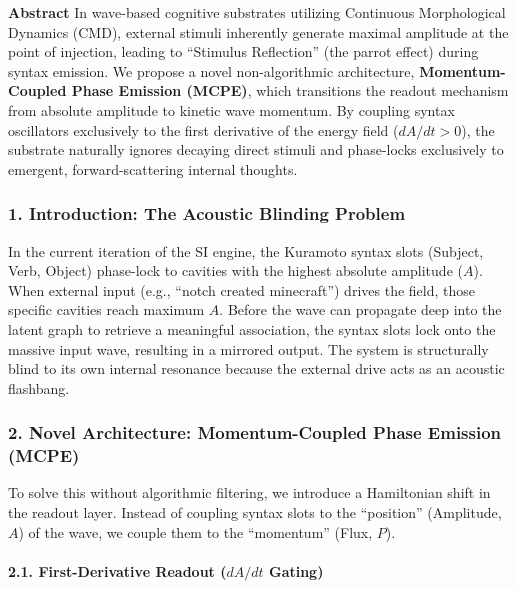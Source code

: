 \documentclass[
  11pt,
  a4paper,
]{article}
\begin{document}
\textbf{Abstract} In wave-based cognitive substrates utilizing
Continuous Morphological Dynamics (CMD), external stimuli inherently
generate maximal amplitude at the point of injection, leading to
``Stimulus Reflection'' (the parrot effect) during syntax emission. We
propose a novel non-algorithmic architecture, \textbf{Momentum-Coupled
Phase Emission (MCPE)}, which transitions the readout mechanism from
absolute amplitude to kinetic wave momentum. By coupling syntax
oscillators exclusively to the first derivative of the energy field
(\(dA/dt > 0\)), the substrate naturally ignores decaying direct stimuli
and phase-locks exclusively to emergent, forward-scattering internal
thoughts.

\subsubsection{1. Introduction: The Acoustic Blinding
Problem}\label{introduction-the-acoustic-blinding-problem}

In the current iteration of the SI engine, the Kuramoto syntax slots
(Subject, Verb, Object) phase-lock to cavities with the highest absolute
amplitude (\(A\)). When external input (e.g., ``notch created
minecraft'') drives the field, those specific cavities reach maximum
\(A\). Before the wave can propagate deep into the latent graph to
retrieve a meaningful association, the syntax slots lock onto the
massive input wave, resulting in a mirrored output. The system is
structurally blind to its own internal resonance because the external
drive acts as an acoustic flashbang.

\subsubsection{2. Novel Architecture: Momentum-Coupled Phase Emission
(MCPE)}\label{novel-architecture-momentum-coupled-phase-emission-mcpe}

To solve this without algorithmic filtering, we introduce a Hamiltonian
shift in the readout layer. Instead of coupling syntax slots to the
``position'' (Amplitude, \(A\)) of the wave, we couple them to the
``momentum'' (Flux, \(P\)).

\paragraph{\texorpdfstring{2.1. First-Derivative Readout (\(dA/dt\)
Gating)}{2.1. First-Derivative Readout (dA/dt Gating)}}\label{first-derivative-readout-dadt-gating}
\end{document}
